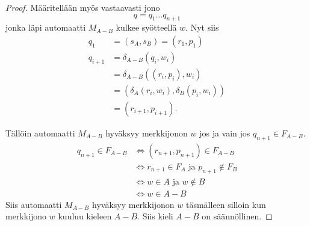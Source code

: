 \documentclass[a4paper,11pt,draft]{article}
\begin{document}
\begin{enumerate}
\begin{proof}
    Määritellään myös vastaavasti jono 
% 
   \begin{equation*}
      q = q_{1} \ldots q_{n+1}
    \end{equation*}
% 
   jonka läpi automaatti $M_{A-B}$ kulkee syötteellä $w$. Nyt siis
%
    \begin{align*}
      q_1 &= (s_A, s_B) = (r_1,p_1) \\
      q_{i+1} &= \delta_{A-B}(q_i, w_i) \\
             &= \delta_{A-B}((r_i, p_i), w_i) \\
             &= (\delta_A(r_i, w_i), \delta_B(p_i, w_i)) \\
             &= (r_{i+1}, p_{i+1}).
    \end{align*}

    Tällöin automaatti $M_{A-B}$ hyväksyy merkkijonon $w$ jos ja vain jos
    $q_{n+1} \in F_{A-B}$.
%
    \begin{align*}
      q_{n+1} \in F_{A-B} &\Leftrightarrow (r_{n+1}, p_{n+1}) \in F_{A-B} \\
      &\Leftrightarrow r_{n+1} \in F_A \text{ ja } p_{n+1} \notin F_B \\
      &\Leftrightarrow w \in A \text{ ja } w \notin B \\
      &\Leftrightarrow w \in A - B
    \end{align*}
%
    Siis automaatti $M_{A-B}$ hyväksyy merkkijonon $w$ täsmälleen
    silloin kun merkkijono $w$ kuuluu kieleen $A - B$. Siis kieli $A -
    B$ on säännöllinen.
  \end{proof}

\end{enumerate}
\end{document}

